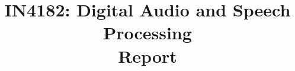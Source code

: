 \documentclass[conference]{IEEEtran}
\begin{document}
\title{IN4182: Digital Audio and Speech Processing\\
    \large Report}
\author{
  \and
}
\maketitle


\listoftodos

 \clearpage
 \clearpage
 \clearpage
 \clearpage
 \clearpage
 \clearpage
 \clearpage


\nocite{*}




\end{document}
